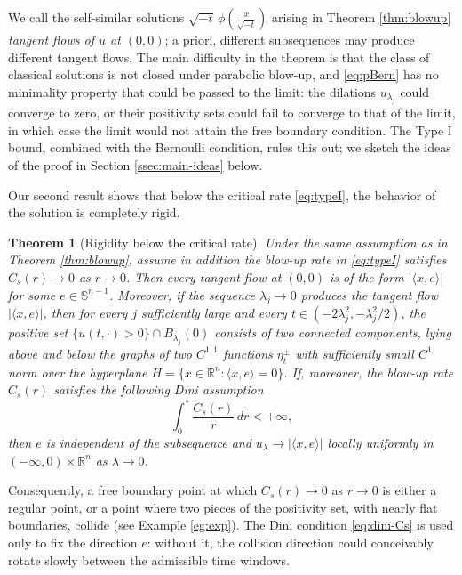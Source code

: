 \documentclass[11pt]{article}
\numberwithin{equation}{section}
\newtheorem{theorem}{Theorem}[section]
\theoremstyle{definition}
\newcommand{\RR}{\mathbb{R}}
\begin{document}
We call the self-similar solutions $\sqrt{-t}\,\phi\left(\tfrac{x}{\sqrt{-t}}\right)$ arising in Theorem \ref{thm:blowup} \emph{tangent flows of $u$ at $(0,0)$}; a priori, different subsequences may produce different tangent flows. The main difficulty in the theorem is that the class of classical solutions is not closed under parabolic blow-up, and \eqref{eq:pBern} has no minimality property that could be passed to the limit: the dilations $u_{\lambda_j}$ could converge to zero, or their positivity sets could fail to converge to that of the limit, in which case the limit would not attain the free boundary condition. The Type I bound, combined with the Bernoulli condition, rules this out; we sketch the ideas of the proof in Section \ref{ssec:main-ideas} below.

Our second result shows that below the critical rate \eqref{eq:typeI}, the behavior of the solution is completely rigid.

\begin{theorem}[Rigidity below the critical rate]\label{thm:blowup-twophase}
    Under the same assumption as in Theorem \ref{thm:blowup}, assume in addition the blow-up rate in \eqref{eq:typeI} satisfies $C_s(r) \to 0$ as $r\to 0$. Then every tangent flow at $(0,0)$ is of the form $|\langle x, e \rangle|$ for some $e\in \mathbb{S}^{n-1}$. Moreover, if the sequence $\lambda_j\to0$ produces the tangent flow $|\langle x, e \rangle|$, then for every $j$ sufficiently large and every $t\in (-2\lambda_j^2, -\lambda_j^2/2)$, the positive set $\{u(t,\cdot)>0\} \cap B_{\lambda_j}(0)$ consists of two connected components, lying above and below the graphs of two $C^{1,1}$ functions $\eta_t^\pm$ with sufficiently small $C^{1}$ norm over the hyperplane $H= \{x\in \mathbb{R}^n: \langle x, e \rangle = 0\}$. If, moreover, the blow-up rate $C_s(r)$ satisfies the following Dini assumption
    \begin{equation}\label{eq:dini-Cs}
        \int_0^{*}\frac{C_s(r)}{r}\,dr<+\infty,
    \end{equation}
    then $e$ is independent of the subsequence and $u_\lambda \to |\langle x, e \rangle|$ locally uniformly in $(-\infty,0)\times\RR^n$ as $\lambda\to0$.
\end{theorem}

Consequently, a free boundary point at which $C_s(r)\to0$ as $r\to0$ is either a regular point, or a point where two pieces of the positivity set, with nearly flat boundaries, collide (see Example \ref{eg:exp}). The Dini condition \eqref{eq:dini-Cs} is used only to fix the direction $e$: without it, the collision direction could conceivably rotate slowly between the admissible time windows.
\end{document}
